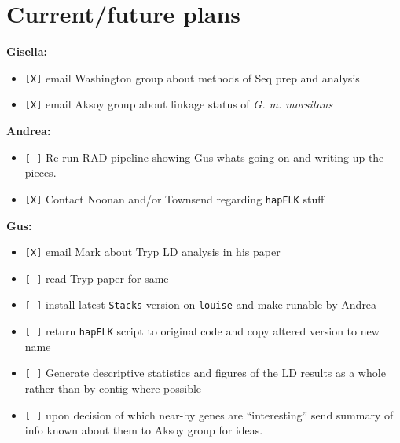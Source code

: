 \documentclass[letterpaper]{scrartcl}
\begin{document}
\section{Current/future plans}\label{currentfuture-plans}

\textbf{Gisella:}

\begin{itemize}
\itemsep1pt\parskip0pt
\item
  \texttt{{[}X{]}} email Washington group about methods of Seq prep and
  analysis
\item
  \texttt{{[}X{]}} email Aksoy group about linkage status of \emph{G. m.
  morsitans}
\end{itemize}

\textbf{Andrea:}

\begin{itemize}
\itemsep1pt\parskip0pt
\item
  \texttt{{[} {]}} Re-run RAD pipeline showing Gus whats going on and
  writing up the pieces.
\item
  \texttt{{[}X{]}} Contact Noonan and/or Townsend regarding
  \texttt{hapFLK} stuff
\end{itemize}

\textbf{Gus:}

\begin{itemize}
\itemsep1pt\parskip0pt
\item
  \texttt{{[}X{]}} email Mark about Tryp LD analysis in his paper
\item
  \texttt{{[} {]}} read Tryp paper for same
\item
  \texttt{{[} {]}} install latest \texttt{Stacks} version on
  \texttt{louise} and make runable by Andrea
\item
  \texttt{{[} {]}} return \texttt{hapFLK} script to original code and
  copy altered version to new name
\item
  \texttt{{[} {]}} Generate descriptive statistics and figures of the LD
  results as a whole rather than by contig where possible
\item
  \texttt{{[} {]}} upon decision of which near-by genes are
  ``interesting'' send summary of info known about them to Aksoy group
  for ideas.
\end{itemize}
\end{document}
